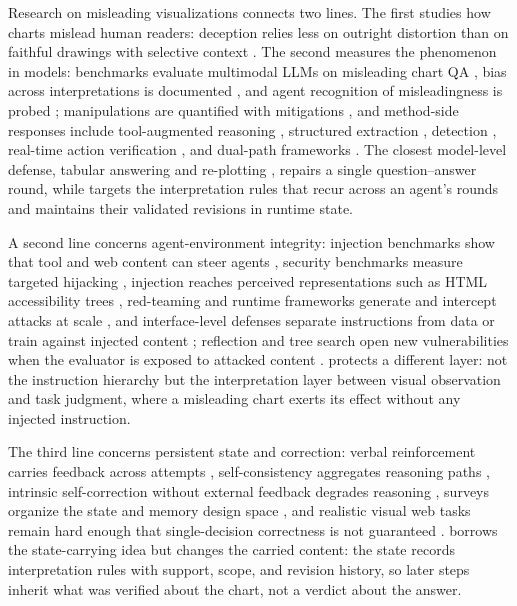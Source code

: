 Research on misleading visualizations connects two
lines.
The first studies how charts mislead human readers:
deception relies less on outright distortion than on
faithful drawings with selective context
\citep{lisnic2023misleading, nadib2026guardrail}.
The second measures the phenomenon in models:
benchmarks evaluate multimodal LLMs on misleading chart
QA \citep{chen2025unmasking, bharti2024chartom,
alexander2024models}, bias across interpretations is
documented \citep{rahman2026same}, and agent
recognition of misleadingness is probed
\citep{panda2026making, blasilli2026true,
seto2026llms}; manipulations are
quantified with mitigations \citep{mahbub2025perils,
mahbub2026chart}, and method-side responses include
tool-augmented reasoning \citep{kaur2025chartagent},
structured extraction \citep{das2025chartsofthought},
detection \citep{tonglet2025this}, real-time action
verification \citep{sharma2026realtime}, and dual-path
frameworks \citep{zhang2026navigating}.
The closest model-level defense, tabular answering and
re-plotting \citep{tonglet2025protecting}, repairs a
single question--answer round, while \ours{} targets
the interpretation rules that recur across an
agent's rounds and maintains their validated revisions
in runtime state.

A second line concerns agent-environment integrity:
injection benchmarks show that tool and web content can
steer agents \citep{zhan2024injecagent}, security
benchmarks measure targeted hijacking
\citep{evtimov2025wasp}, injection reaches perceived
representations such as HTML accessibility trees
\citep{johnson2025manipulating}, red-teaming and
runtime frameworks generate and intercept attacks at
scale \citep{wang2025agentvigil, zhao2026clawguard},
and interface-level defenses separate instructions from
data \citep{chen2024struq} or train against injected
content \citep{chen2024secalign}; reflection and tree
search open new vulnerabilities when the evaluator is
exposed to attacked content \citep{wu2024dissecting}.
\ours{} protects a different layer: not the instruction
hierarchy but the interpretation layer between visual
observation and task judgment, where a misleading chart
exerts its effect without any injected instruction.

The third line concerns persistent state and
correction: verbal reinforcement carries feedback
across attempts \citep{shinn2023reflexion},
self-consistency aggregates reasoning paths
\citep{wang2022selfconsistency}, intrinsic
self-correction without external feedback degrades
reasoning \citep{huang2023large, li2025decomposing},
surveys organize the state and memory design space
\citep{wang2024survey, hu2025agents,
zhou2026ready},
and realistic
visual web tasks remain hard enough that
single-decision correctness is not guaranteed
\citep{koh2024visualwebarena}.
\ours{} borrows the state-carrying idea but changes the
carried content: the state records interpretation rules
with support, scope, and revision history, so later steps inherit what was verified about the
chart, not a verdict about the answer.
